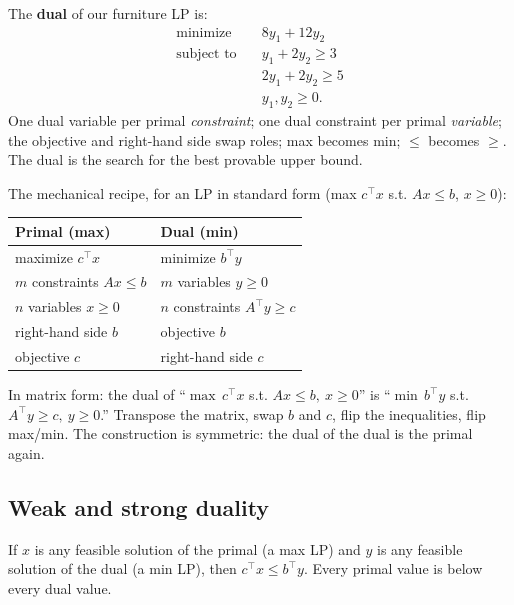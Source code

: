 \begin{focusbox}
The \textbf{dual} of our furniture LP is:
\[
\begin{aligned}
\text{minimize}\quad   & 8y_1 + 12y_2 \\
\text{subject to}\quad & y_1 + 2y_2 \ge 3 \\
                       & 2y_1 + 2y_2 \ge 5 \\
                       & y_1, y_2 \ge 0.
\end{aligned}
\]
One dual variable per primal \emph{constraint}; one dual constraint per primal
\emph{variable}; the objective and right-hand side swap roles; max becomes min;
$\le$ becomes $\ge$. The dual is the search for the best provable upper bound.
\end{focusbox}

The mechanical recipe, for an LP in standard form (max $c^\top x$ s.t.
$Ax \le b$, $x\ge 0$):

\begin{center}
\begin{tabular}{ll}
\toprule
\textbf{Primal (max)} & \textbf{Dual (min)} \\
\midrule
maximize $c^\top x$              & minimize $b^\top y$ \\
$m$ constraints $Ax \le b$       & $m$ variables $y \ge 0$ \\
$n$ variables $x \ge 0$          & $n$ constraints $A^\top y \ge c$ \\
right-hand side $b$              & objective $b$ \\
objective $c$                    & right-hand side $c$ \\
\bottomrule
\end{tabular}
\end{center}

In matrix form: the dual of ``$\max\, c^\top x$ s.t. $Ax\le b,\ x\ge 0$'' is
``$\min\, b^\top y$ s.t. $A^\top y \ge c,\ y \ge 0$.'' Transpose the matrix,
swap $b$ and $c$, flip the inequalities, flip max/min. The construction is symmetric:
the dual of the dual is the primal again.

\subsection{Weak and strong duality}

\begin{theorem}
If $x$ is any feasible solution of the primal (a max LP) and $y$ is any
feasible solution of the dual (a min LP), then $c^\top x \le b^\top y$. Every
primal value is below every dual value.
\end{theorem}

